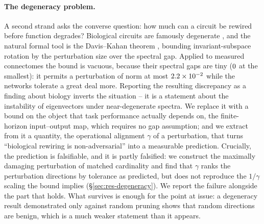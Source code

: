 \paragraph{The degeneracy problem.}
A second strand asks the converse question: how much can a circuit be rewired before
function degrades? Biological circuits are famously degenerate
\cite{prinz2004similar,marder2011variability,edelman2001degeneracy}, and the natural
formal tool is the Davis--Kahan theorem \cite{daviskahan1970rotation}, bounding
invariant-subspace rotation by the perturbation size over the spectral gap. Applied to
measured connectomes the bound is vacuous, because their spectral gaps are tiny
($0$ at the smallest): it permits a perturbation of norm at most
$2.2 \times 10^{-2}$ while the networks tolerate a great deal more.
Reporting the resulting discrepancy as a finding about biology inverts the situation --
it is a statement about the instability of eigenvectors under near-degenerate spectra.
We replace it with a bound on the object that task performance actually depends on, the
finite-horizon input--output map, which requires no gap assumption; and we extract from
it a quantity, the operational alignment $\gamma$ of a perturbation, that turns
``biological rewiring is non-adversarial'' into a measurable prediction. Crucially, the
prediction is falsifiable, and it is partly falsified: we construct the maximally
damaging perturbation of matched cardinality and find that $\gamma$ ranks the
perturbation directions by tolerance as predicted, but does not reproduce the $1/\gamma$
scaling the bound implies (\S\ref{sec:res-degeneracy}). We report the failure alongside
the part that holds. What survives is enough for the point at issue: a degeneracy result
demonstrated only against random pruning shows that random directions are benign, which
is a much weaker statement than it appears.

